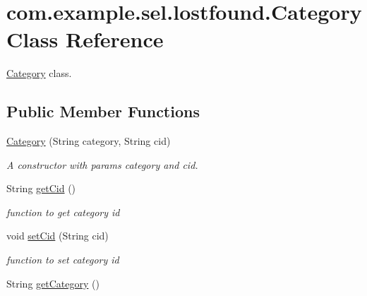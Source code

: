 \hypertarget{classcom_1_1example_1_1sel_1_1lostfound_1_1Category}{}\section{com.\+example.\+sel.\+lostfound.\+Category Class Reference}
\label{classcom_1_1example_1_1sel_1_1lostfound_1_1Category}


\hyperlink{classcom_1_1example_1_1sel_1_1lostfound_1_1Category}{Category} class.  


\subsection*{Public Member Functions}
\begin{DoxyCompactItemize}
\item 
\hyperlink{classcom_1_1example_1_1sel_1_1lostfound_1_1Category_a01e1a68dd2639ab6bee0007cc1dcf294}{Category} (String category, String cid)
\begin{DoxyCompactList}\small\item\em A constructor with params category and cid. \end{DoxyCompactList}\item 
String \hyperlink{classcom_1_1example_1_1sel_1_1lostfound_1_1Category_a9394ecafd86528fa00554aecbc76ebdb}{get\+Cid} ()\hypertarget{classcom_1_1example_1_1sel_1_1lostfound_1_1Category_a9394ecafd86528fa00554aecbc76ebdb}{}\label{classcom_1_1example_1_1sel_1_1lostfound_1_1Category_a9394ecafd86528fa00554aecbc76ebdb}

\begin{DoxyCompactList}\small\item\em function to get category id \end{DoxyCompactList}\item 
void \hyperlink{classcom_1_1example_1_1sel_1_1lostfound_1_1Category_ae020ac053079f77939440df880c105d7}{set\+Cid} (String cid)\hypertarget{classcom_1_1example_1_1sel_1_1lostfound_1_1Category_ae020ac053079f77939440df880c105d7}{}\label{classcom_1_1example_1_1sel_1_1lostfound_1_1Category_ae020ac053079f77939440df880c105d7}

\begin{DoxyCompactList}\small\item\em function to set category id \end{DoxyCompactList}\item 
String \hyperlink{classcom_1_1example_1_1sel_1_1lostfound_1_1Category_aad1c1ed95ef449791e1e27725ed60314}{get\+Category} ()\hypertarget{classcom_1_1example_1_1sel_1_1lostfound_1_1Category_aad1c1ed95ef449791e1e27725ed60314}{}\label{classcom_1_1example_1_1sel_1_1lostfound_1_1Category_aad1c1ed95ef449791e1e27725ed60314}


\end{DoxyCompactItemize}
